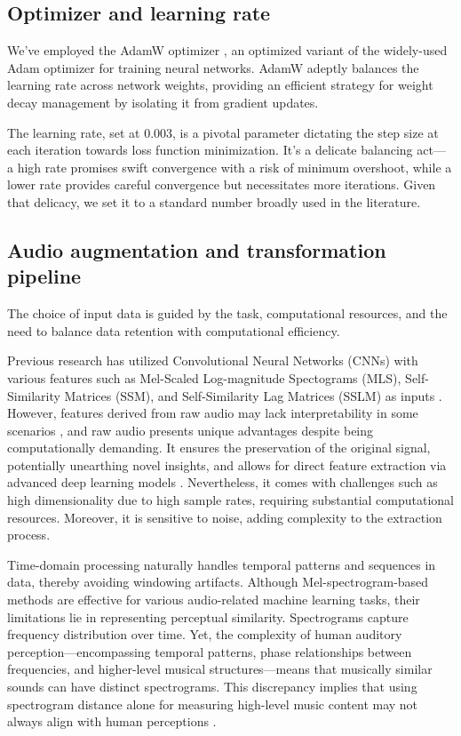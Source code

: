 

\subsection{Optimizer and learning rate}

We've employed the AdamW optimizer \cite{Loshchilov2017DecoupledRegularization}, an optimized variant of the widely-used Adam optimizer for training neural networks. AdamW adeptly balances the learning rate across network weights, providing an efficient strategy for weight decay management by isolating it from gradient updates. 

The learning rate, set at 0.003, is a pivotal parameter dictating the step size at each iteration towards loss function minimization. It's a delicate balancing act— a high rate promises swift convergence with a risk of minimum overshoot, while a lower rate provides careful convergence but necessitates more iterations. Given that delicacy, we set it to a standard number broadly used in the literature.

\subsection{Audio augmentation and transformation pipeline}

The choice of input data is guided by the task, computational resources, and the need to balance data retention with computational efficiency.

Previous research has utilized Convolutional Neural Networks (CNNs) with various features such as Mel-Scaled Log-magnitude Spectograms (MLS), Self-Similarity Matrices (SSM), and Self-Similarity Lag Matrices (SSLM) as inputs \cite{Hernandez-Olivan2021MusicFeatures}. However, features derived from raw audio may lack interpretability in some scenarios \cite{Schindler2020DeepTutorial}, and raw audio presents unique advantages despite being computationally demanding. It ensures the preservation of the original signal, potentially unearthing novel insights, and allows for direct feature extraction via advanced deep learning models \cite{learning}. Nevertheless, it comes with challenges such as high dimensionality due to high sample rates, requiring substantial computational resources. Moreover, it is sensitive to noise, adding complexity to the extraction process.

Time-domain processing naturally handles temporal patterns and sequences in data, thereby avoiding windowing artifacts. Although Mel-spectrogram-based methods are effective for various audio-related machine learning tasks, their limitations lie in representing perceptual similarity. Spectrograms capture frequency distribution over time. Yet, the complexity of human auditory perception—encompassing temporal patterns, phase relationships between frequencies, and higher-level musical structures—means that musically similar sounds can have distinct spectrograms. This discrepancy implies that using spectrogram distance alone for measuring high-level music content may not always align with human perceptions \cite{Kim2020OneStrategies, Mesostructures2023}.

